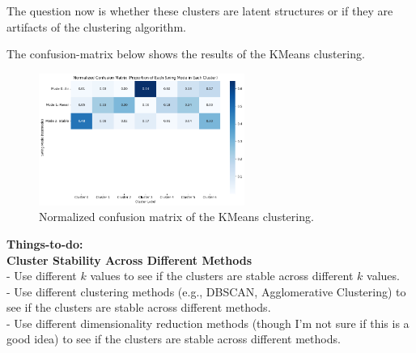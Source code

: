 \documentclass[12pt]{article}
\begin{document}
The question now is whether these clusters are latent structures or if they are artifacts of the clustering algorithm.

The confusion-matrix below shows the results of the KMeans clustering.

\begin{figure}[H]
    \centering
    \includegraphics[width=0.6\textwidth]{normalized_confusion_matrix.png}
    \caption{Normalized confusion matrix of the KMeans clustering.}
    \label{fig:confusion_matrix}
\end{figure}

\textbf{Things-to-do:}
\\
\textbf{Cluster Stability Across Different Methods}\\
- Use different $k$ values to see if the clusters are stable across different $k$ values.\\
- Use different clustering methods (e.g., DBSCAN, Agglomerative Clustering) to see if the clusters are stable across different methods.\\
- Use different dimensionality reduction methods (though I'm not sure if this is a good idea) to see if the clusters are stable across different methods.\\

\vspace{20pt}

\newpage
\end{document}
